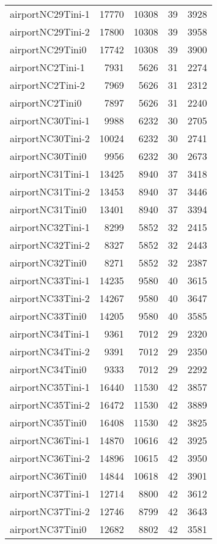 \begin{tabular}{lrrrr}
airportNC29Tini-1 & 17770 & 10308 & 39 & 3928 \\
airportNC29Tini-2 & 17800 & 10308 & 39 & 3958 \\
airportNC29Tini0 & 17742 & 10308 & 39 & 3900 \\
airportNC2Tini-1 & 7931 & 5626 & 31 & 2274 \\
airportNC2Tini-2 & 7969 & 5626 & 31 & 2312 \\
airportNC2Tini0 & 7897 & 5626 & 31 & 2240 \\
airportNC30Tini-1 & 9988 & 6232 & 30 & 2705 \\
airportNC30Tini-2 & 10024 & 6232 & 30 & 2741 \\
airportNC30Tini0 & 9956 & 6232 & 30 & 2673 \\
airportNC31Tini-1 & 13425 & 8940 & 37 & 3418 \\
airportNC31Tini-2 & 13453 & 8940 & 37 & 3446 \\
airportNC31Tini0 & 13401 & 8940 & 37 & 3394 \\
airportNC32Tini-1 & 8299 & 5852 & 32 & 2415 \\
airportNC32Tini-2 & 8327 & 5852 & 32 & 2443 \\
airportNC32Tini0 & 8271 & 5852 & 32 & 2387 \\
airportNC33Tini-1 & 14235 & 9580 & 40 & 3615 \\
airportNC33Tini-2 & 14267 & 9580 & 40 & 3647 \\
airportNC33Tini0 & 14205 & 9580 & 40 & 3585 \\
airportNC34Tini-1 & 9361 & 7012 & 29 & 2320 \\
airportNC34Tini-2 & 9391 & 7012 & 29 & 2350 \\
airportNC34Tini0 & 9333 & 7012 & 29 & 2292 \\
airportNC35Tini-1 & 16440 & 11530 & 42 & 3857 \\
airportNC35Tini-2 & 16472 & 11530 & 42 & 3889 \\
airportNC35Tini0 & 16408 & 11530 & 42 & 3825 \\
airportNC36Tini-1 & 14870 & 10616 & 42 & 3925 \\
airportNC36Tini-2 & 14896 & 10615 & 42 & 3950 \\
airportNC36Tini0 & 14844 & 10618 & 42 & 3901 \\
airportNC37Tini-1 & 12714 & 8800 & 42 & 3612 \\
airportNC37Tini-2 & 12746 & 8799 & 42 & 3643 \\
airportNC37Tini0 & 12682 & 8802 & 42 & 3581 \\

\end{tabular}
